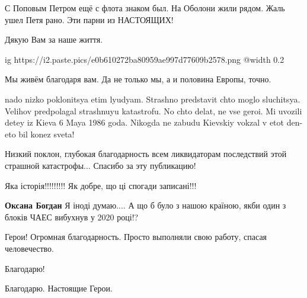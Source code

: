  
 
 
 
 
\zzSecCmt

\begin{itemize} %
С Поповым Петром ещё с флота знаком был. На Оболони жили рядом. Жаль ушел Петя рано. Эти парни из НАСТОЯЩИХ!

Дякую Вам за наше життя.


\ifcmt
  ig https://i2.paste.pics/e0b610272ba80959ae997d77609b2578.png
  @width 0.2
\fi

Мы живём благодаря вам. Да не только мы, а и половина Европы, точно.

\begin{itemize} %

nado nizko poklonitsya etim lyudyam. Strashno predstavit chto moglo
sluchitsya. Velihov predpolagal strashnuyu katastrofu. No chto delat, ne vse
geroi. Mi uvozili detey iz Kieva 6 Maya 1986 goda. Nikogda ne zabudu Kievskiy
vokzal v etot den-eto bil konez sveta!

\end{itemize} %

Низкий поклон, глубокая благодарность всем ликвидаторам последствий этой страшной катастрофы...
Спасибо за эту публикацию!

Яка історія!!!!!!!!! Як добре, що ці спогади записані!!!

\begin{itemize} %
\textbf{Оксана Богдан} Я іноді думаю.... А що б було з нашою країною, якби один з блоків ЧАЕС вибухнув у 2020 році!?
\end{itemize} %

Герои! Огромная благодарность. Просто выполняли свою работу, спасая человечество.

Благодарю!

Благодарю. Настоящие Герои.


\end{itemize} %
